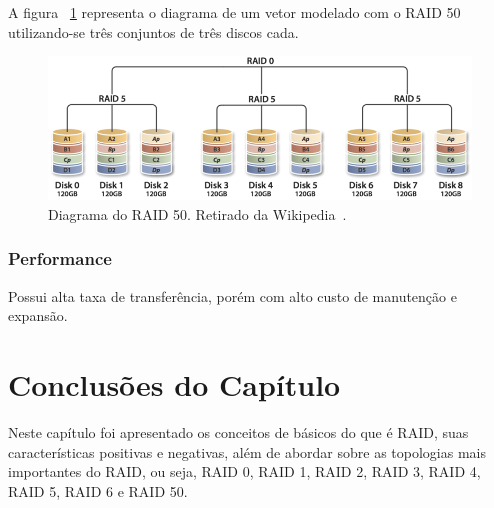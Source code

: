 		A figura ~\ref{fig:raid50} representa o diagrama de um vetor modelado com o RAID 50 utilizando-se três conjuntos de três discos cada.\\
		
		\begin{figure}[htb]
			\begin{center}
				
				\includegraphics[clip,width=15.0cm]{images/RAID_50.png}
				\caption{Diagrama do RAID 50. Retirado da Wikipedia~\citep{wikiRAIDlevels}.}
				\label{fig:raid50}
			\end{center}
		\end{figure} 
		
		\subsubsection{Performance}
		Possui alta taxa de transferência, porém com alto custo de manutenção e expansão.
		
	
	\section{Conclusões do Capítulo}
	Neste capítulo foi apresentado os conceitos de básicos do que é RAID, suas características positivas e negativas, além de abordar sobre as topologias mais importantes do RAID, ou seja, RAID 0, RAID 1, RAID 2, RAID 3, RAID 4, RAID 5, RAID 6 e RAID 50.
		



 

	

